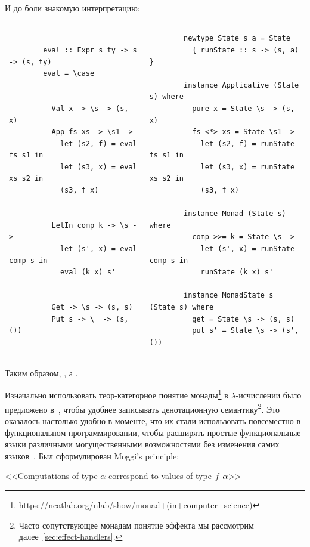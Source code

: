 И до боли знакомую интерпретацию:

\begin{tabular}{p{8cm}p{8cm}}
    \begin{verbatim}
        eval :: Expr s ty -> s -> (s, ty)
        eval = \case


          Val x -> \s -> (s, x)
          App fs xs -> \s1 ->
            let (s2, f) = eval fs s1 in
            let (s3, x) = eval xs s2 in
            (s3, f x)


          LetIn comp k -> \s ->
            let (s', x) = eval comp s in
            eval (k x) s'


          Get -> \s -> (s, s)
          Put s -> \_ -> (s, ())
    \end{verbatim}
    &
    \begin{verbatim}
        newtype State s a = State
          { runState :: s -> (s, a) }

        instance Applicative (State s) where
          pure x = State \s -> (s, x)
          fs <*> xs = State \s1 ->
            let (s2, f) = runState fs s1 in
            let (s3, x) = runState xs s2 in
            (s3, f x)

        instance Monad (State s) where
          comp >>= k = State \s ->
            let (s', x) = runState comp s in
            runState (k x) s'

        instance MonadState s (State s) where
          get = State \s -> (s, s)
          put s' = State \s -> (s', ())
    \end{verbatim}
\end{tabular}
\vspace{1em}

Таким образом, , а .

Изначально использовать теор-категорное понятие монады\footnote{\url{https://ncatlab.org/nlab/show/monad+(in+computer+science)}} в $\lambda$-исчислении было предложено в~\cite{moggi1988computational}, чтобы удобнее записывать денотационную семантику\footnote{Часто сопутствующее монадам понятие эффекта мы рассмотрим далее~\ref{sec:effect-handlers}.}.
Это оказалось настолько удобно в моменте, что их стали использовать повсеместно в функциональном программировании, чтобы расширять простые функциональные языки различными могущественными возможностями без изменения самих языков~\cite{wadler1990comprehending, wadler1992essence}.
Был сформулирован Moggi's principle:
\begin{center}
    <<Computations of type $\alpha$ correspond to values of type $f~\alpha$>>
\end{center}

